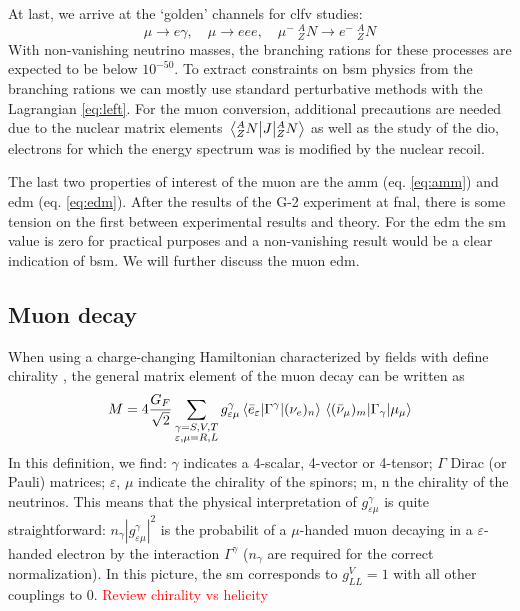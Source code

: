 \begin{refsection}
        At last, we arrive at the `golden' channels for \gls{clfv} studies:
        \begin{equation}
            \mu\rightarrow e\gamma, \quad \mu\rightarrow eee, \quad \mu^- \ ^A_ZN\rightarrow e^-\ ^A_ZN
        \end{equation}    
        With non-vanishing neutrino masses, the branching rations for these processes are expected to be below $10^{-50}$.
        To extract constraints on \gls{bsm} physics from the branching rations we can mostly use standard perturbative methods with the Lagrangian \ref{eq:left}.
        For the muon conversion, additional precautions are needed due to the nuclear matrix elements $\matrixel{^A_ZN}{J}{^A_ZN}$ as well as the study of the \gls{dio}, electrons for which the energy spectrum was is modified by the nuclear recoil.
        
        The last two properties of interest of the muon are the \gls{amm} (eq. \ref{eq:amm}) and \gls{edm} (eq. \ref{eq:edm}). 
        After the results of the G-2 experiment at \gls{fnal}, there is some tension on the first between experimental results and theory. 
        For the \gls{edm} the \gls{sm} value is zero for practical purposes and a non-vanishing result would be a clear indication of \gls{bsm}.
        We will further discuss the muon \gls{edm}.

    \subsection{Muon decay}
        When using a charge-changing Hamiltonian characterized by fields with define chirality \cite{5}, the general matrix element of the muon decay can be written as \cite{7}
        \begin{equation}
            M=4\frac{G_F}{\sqrt{2}}\sum_{\substack{ \gamma = S,V,T \\ \varepsilon,\mu = R,L}}g^\gamma_{\varepsilon\mu} \matrixel{\bar{e}_\varepsilon}{\Gamma^\gamma}{(\nu_e)_n} \matrixel{(\bar{\nu}_\mu)_m}{\Gamma_\gamma}{\mu_\mu}
        \end{equation}
        In this definition, we find: $\gamma$ indicates a 4-scalar, 4-vector or 4-tensor; $\Gamma$ Dirac (or Pauli) matrices; $\varepsilon$, $\mu$ indicate the chirality of the spinors; m, n the chirality of the neutrinos.
        This means that the physical interpretation of $g^\gamma_{\varepsilon\mu}$ is quite straightforward: $n_\gamma|g^\gamma_{\varepsilon\mu}|^2$ is the probabilit of a $\mu$-handed muon decaying in a $\varepsilon$-handed electron by the interaction $\Gamma^\gamma$ ($n_\gamma$ are required for the correct normalization).
        In this picture, the \gls{sm} corresponds to $g_{LL}^V=1$ with all other couplings to 0. 
        \textcolor{red}{Review chirality vs helicity}
        

\end{refsection}
